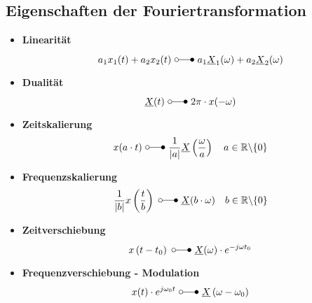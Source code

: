 \subsection{Eigenschaften der Fouriertransformation}
\begin{mdframed}[style=exercise,nobreak=false]
	\begin{itemize}
		\item \textbf{Linearität}
		      \[
			      a_{1} x_{1}(t)+a_{2} x_{2}(t)\ \laplace\  a_{1} \underline{X}_{1}(\omega)+a_{2} \underline{X}_{2}(\omega)
		      \]
		\item \textbf{Dualität}
		      \[
			      \underline{X}(t)\ \laplace\  2\pi\cdot x(-\omega)
		      \]
		\item \textbf{Zeitskalierung}
		      \[
			      x(a \cdot t)\ \laplace\ \frac{1}{|a|} \underline{X}\left(\frac{\omega}{a}\right) \quad a \in \mathbb{R} \backslash\{0\}
		      \]
		\item \textbf{Frequenzskalierung}
		      \[
			      \frac{1}{|b|} x\left(\frac{t}{b}\right)\ \laplace\ \underline{X}(b\cdot\omega) \quad b \in \mathbb{R} \backslash\{0\}
		      \]
		\item \textbf{Zeitverschiebung}
		      \[
			      x\left(t-t_{0}\right)\ \laplace\ \underline{X}(\omega) \cdot e^{-j \omega t_{0}}
		      \]
		\item \textbf{Frequenzverschiebung - Modulation}
		      \[
			      x(t) \cdot e^{j \omega_{0} t}\ \laplace\ \underline{X}\left(\omega-\omega_{0}\right)
		      \]

\end{itemize}
\end{mdframed}
